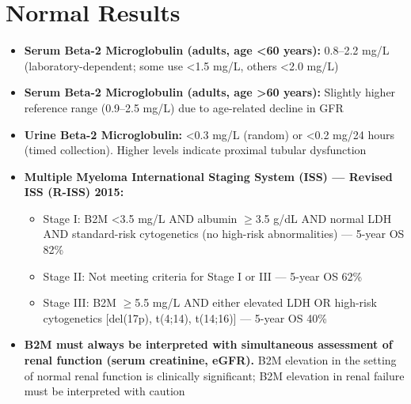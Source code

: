 \section*{Normal Results}
\begin{itemize}
  \item \textbf{Serum Beta-2 Microglobulin (adults, age <60 years):} 0.8--2.2 mg/L (laboratory-dependent; some use <1.5 mg/L, others <2.0 mg/L)
  \item \textbf{Serum Beta-2 Microglobulin (adults, age >60 years):} Slightly higher reference range (0.9--2.5 mg/L) due to age-related decline in GFR
  \item \textbf{Urine Beta-2 Microglobulin:} <0.3 mg/L (random) or <0.2 mg/24 hours (timed collection). Higher levels indicate proximal tubular dysfunction
  \item \textbf{Multiple Myeloma International Staging System (ISS) --- Revised ISS (R-ISS) 2015:}
  \begin{itemize}
    \item Stage I: B2M <3.5 mg/L AND albumin $\geq$3.5 g/dL AND normal LDH AND standard-risk cytogenetics (no high-risk abnormalities) --- 5-year OS 82\%
    \item Stage II: Not meeting criteria for Stage I or III --- 5-year OS 62\%
    \item Stage III: B2M $\geq$5.5 mg/L AND either elevated LDH OR high-risk cytogenetics [del(17p), t(4;14), t(14;16)] --- 5-year OS 40\%
  \end{itemize}
  \item \textbf{B2M must always be interpreted with simultaneous assessment of renal function (serum creatinine, eGFR).} B2M elevation in the setting of normal renal function is clinically significant; B2M elevation in renal failure must be interpreted with caution
\end{itemize}

